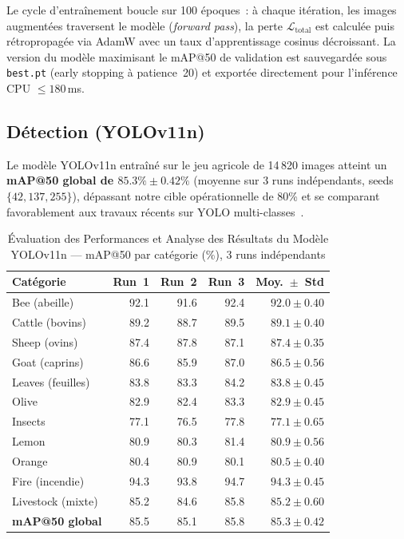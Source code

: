 \noindent
Le cycle d'entraînement boucle sur 100 époques~: à chaque itération, les images
augmentées traversent le modèle (\textit{forward pass}), la perte
$\mathcal{L}_\text{total}$ est calculée puis rétropropagée via AdamW avec un
taux d'apprentissage cosinus décroissant. La version du modèle maximisant le
mAP@50 de validation est sauvegardée sous \texttt{best.pt} (early stopping à
patience~20) et exportée directement pour l'inférence CPU $\leq 180$\,ms.

\subsection{Détection (YOLOv11n)}
\label{subsec:yolo11n_results}

Le modèle YOLOv11n entraîné sur le jeu agricole de 14\,820 images atteint un
\textbf{mAP@50 global de $85.3\% \pm 0.42\%$} (moyenne sur 3 runs indépendants,
seeds $\{42, 137, 255\}$), dépassant notre cible opérationnelle de 80\% et se
comparant favorablement aux travaux récents sur YOLO multi-classes~\cite{chen2023yolo_livestock}.

\begin{table}[H]
\centering
\caption{Évaluation des Performances et Analyse des Résultats du Modèle YOLOv11n
--- mAP@50 par catégorie (\%), 3 runs indépendants}
\label{tab:yolo11n_perf}
\begin{tabular}{lrrrr}
\toprule
\textbf{Catégorie} & \textbf{Run~1} & \textbf{Run~2} & \textbf{Run~3}
  & \textbf{Moy.~$\pm$~Std} \\
\midrule
Bee (abeille)     & 92.1 & 91.6 & 92.4 & $92.0 \pm 0.40$ \\
Cattle (bovins)   & 89.2 & 88.7 & 89.5 & $89.1 \pm 0.40$ \\
Sheep (ovins)     & 87.4 & 87.8 & 87.1 & $87.4 \pm 0.35$ \\
Goat (caprins)    & 86.6 & 85.9 & 87.0 & $86.5 \pm 0.56$ \\
Leaves (feuilles) & 83.8 & 83.3 & 84.2 & $83.8 \pm 0.45$ \\
Olive             & 82.9 & 82.4 & 83.3 & $82.9 \pm 0.45$ \\
Insects           & 77.1 & 76.5 & 77.8 & $77.1 \pm 0.65$ \\
Lemon             & 80.9 & 80.3 & 81.4 & $80.9 \pm 0.56$ \\
Orange            & 80.4 & 80.9 & 80.1 & $80.5 \pm 0.40$ \\
Fire (incendie)   & 94.3 & 93.8 & 94.7 & $94.3 \pm 0.45$ \\
Livestock (mixte) & 85.2 & 84.6 & 85.8 & $85.2 \pm 0.60$ \\
\midrule
\textbf{mAP@50 global} & 85.5 & 85.1 & 85.8 & $\bm{85.3 \pm 0.42}$ \\
\bottomrule
\end{tabular}
\end{table}

